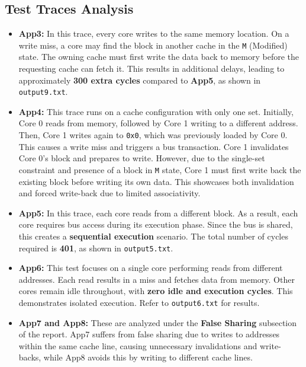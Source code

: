 \documentclass{article}
\begin{document}
\subsection{Test Traces Analysis}

\begin{itemize}
    \item \textbf{App3:} In this trace, every core writes to the same memory location. On a write miss, a core may find the block in another cache in the \texttt{M} (Modified) state. The owning cache must first write the data back to memory before the requesting cache can fetch it. This results in additional delays, leading to approximately \textbf{300 extra cycles} compared to \textbf{App5}, as shown in \texttt{output9.txt}.

    \item \textbf{App4:} This trace runs on a cache configuration with only one set. Initially, Core 0 reads from memory, followed by Core 1 writing to a different address. Then, Core 1 writes again to \texttt{0x0}, which was previously loaded by Core 0. This causes a write miss and triggers a bus transaction. Core 1 invalidates Core 0's block and prepares to write. However, due to the single-set constraint and presence of a block in \texttt{M} state, Core 1 must first write back the existing block before writing its own data. This showcases both invalidation and forced write-back due to limited associativity.

    \item \textbf{App5:} In this trace, each core reads from a different block. As a result, each core requires bus access during its execution phase. Since the bus is shared, this creates a \textbf{sequential execution} scenario. The total number of cycles required is \textbf{401}, as shown in \texttt{output5.txt}.

    \item \textbf{App6:} This test focuses on a single core performing reads from different addresses. Each read results in a miss and fetches data from memory. Other cores remain idle throughout, with \textbf{zero idle and execution cycles}. This demonstrates isolated execution. Refer to \texttt{output6.txt} for results.

    \item \textbf{App7 and App8:} These are analyzed under the \textbf{False Sharing} subsection of the report. App7 suffers from false sharing due to writes to addresses within the same cache line, causing unnecessary invalidations and write-backs, while App8 avoids this by writing to different cache lines.


\end{itemize}
\end{document}
